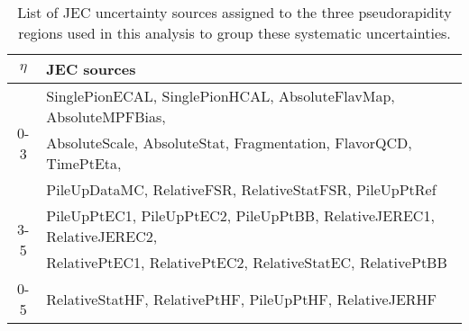 \begin{table}[!]
    \centering
    \caption[Jet energy correction uncertainty groupings.]{List of JEC uncertainty sources assigned to the three pseudorapidity regions used in this analysis to group these systematic uncertainties.}\label{SU:jec_groupings}
    \begin{tabular}{cl}
        \toprule
        $\eta$  & JEC sources   \\ \midrule
        \multirow{3}{*}{0-3}       & {\small SinglePionECAL, SinglePionHCAL, AbsoluteFlavMap, AbsoluteMPFBias,}  \\
                                & {\small AbsoluteScale, AbsoluteStat, Fragmentation, FlavorQCD, TimePtEta,} \\
                                & {\small PileUpDataMC, RelativeFSR, RelativeStatFSR, PileUpPtRef} \\ \midrule
        \multirow{2}{*}{3-5}       & {\small PileUpPtEC1, PileUpPtEC2, PileUpPtBB, RelativeJEREC1, RelativeJEREC2,} \\
                                & {\small RelativePtEC1, RelativePtEC2, RelativeStatEC, RelativePtBB} \\ \midrule
        0-5                        & {\small RelativeStatHF, RelativePtHF, PileUpPtHF, RelativeJERHF} \\ \bottomrule
    \end{tabular}
\end{table}

